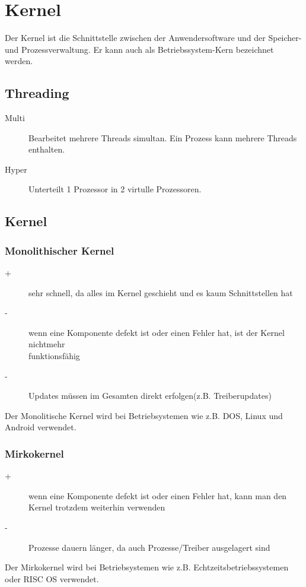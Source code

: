 \documentclass[12pt,a4paper]{article}
\begin{document}
\section{Kernel}
	Der Kernel ist die Schnittstelle zwischen der Anwendersoftware und der Speicher- und Prozessverwaltung. Er kann auch als Betriebssystem-Kern bezeichnet werden.
	
	\subsection{Threading}
		\begin{description}
			\item[Multi] Bearbeitet mehrere Threads simultan. Ein Prozess kann mehrere Threads enthalten.
			\item[Hyper] Unterteilt 1 Prozessor in 2 virtulle Prozessoren.
		\end{description}

	\subsection{Kernel}
		
	\subsubsection{Monolithischer Kernel}
		\begin{description}
			\item[+]{sehr schnell, da alles im Kernel geschieht und es kaum Schnittstellen hat}
			\item[-]{wenn eine Komponente defekt ist oder einen Fehler hat, ist der Kernel nichtmehr \\ funktionsfähig}
			\item[-]{Updates müssen im Gesamten direkt erfolgen(z.B. Treiberupdates)}
		\end{description}
		Der Monolitische Kernel wird bei Betriebsystemen wie z.B. DOS, Linux und Android verwendet.
	
	\subsubsection{Mirkokernel}
		\begin{description}
			\item[+]{wenn eine Komponente defekt ist oder einen Fehler hat, kann man den Kernel trotzdem weiterhin 							 verwenden}
			\item[-]{Prozesse dauern länger, da auch Prozesse/Treiber ausgelagert sind}
		\end{description}
		Der Mirkokernel wird bei Betriebsystemen wie z.B. Echtzeitsbetriebssystemen oder RISC OS verwendet.
	
\end{document}
